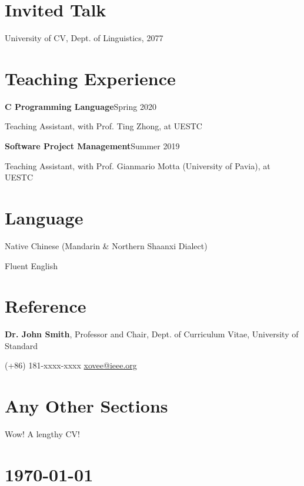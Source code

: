 \documentclass{article}
\newcommand{\cvsection}[1]{\section*{\rmfamily#1}}
\begin{document}
\cvsection{Invited Talk}
\indent 

University of CV, Dept. of Linguistics, 2077 



\cvsection{Teaching Experience}
\indent

\textbf{C Programming Language}\hfill Spring 2020

\hspace{2em}Teaching Assistant, with Prof. Ting Zhong, at UESTC

\textbf{Software Project Management}\hfill Summer 2019

\hspace{2em}Teaching Assistant, with Prof. Gianmario Motta (University of Pavia), at UESTC














\cvsection{Language}
\indent

Native Chinese (Mandarin \& Northern Shaanxi Dialect)

Fluent English




\cvsection{Reference}
\indent

\textbf{Dr. John Smith}, Professor and Chair, Dept. of Curriculum Vitae, University of Standard

\hspace{2em}(+86) 181-xxxx-xxxx \hspace{2em} \url{xovee@ieee.org}


\cvsection{Any Other Sections}
\indent 

Wow! A lengthy CV!


\vfill

\section*{\hfill\color{OliveGreen}\today}
\end{document}
